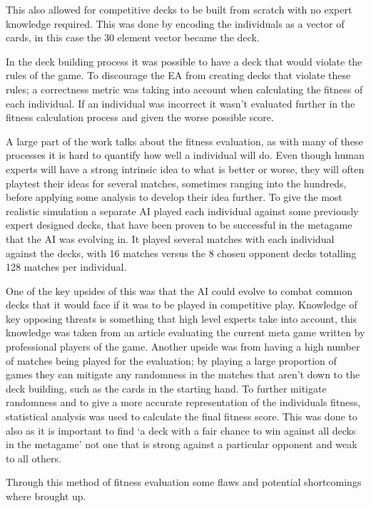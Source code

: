 \documentclass[a4paper]{article}
\begin{document}
This also allowed for competitive decks to be built from scratch with no expert knowledge required.
This was done by encoding the individuals as a vector of cards, in this case the 30 element vector became the deck.
\par
In the deck building process it was possible to have a deck that would violate the rules of the game.
To discourage the EA from creating decks that violate these rules; a correctness metric was taking into account when calculating the fitness of each individual.
If an individual was incorrect it wasn't evaluated further in the fitness calculation process and given the worse possible score.
\\ \par
A large part of the work talks about the fitness evaluation, as with many of these processes it is hard to quantify how well a individual will do.
Even though human experts will have a strong intrinsic idea to what is better or worse, they will often playtest their ideas for several matches, sometimes ranging into the hundreds, before applying some analysis to develop their idea further.
To give the most realistic simulation a separate AI played each individual against some previously expert designed decks, that have been proven to be successful in the metagame that the AI was evolving in.
It played several matches with each individual against the decks, with 16 matches versus the 8 chosen opponent decks totalling 128 matches per individual.
\par
One of the key upsides of this was that the AI could evolve to combat common decks that it would face if it was to be played in competitive play.
Knowledge of key opposing threats is something that high level experts take into account, this knowledge was taken from an article evaluating the current meta game written by professional players of the game.
Another upside was from having a high number of matches being played for the evaluation; by playing a large proportion of games they can mitigate any randomness in the matches that aren't down to the deck building, such as the cards in the starting hand.
To further mitigate randomness and to give a more accurate representation of the individuals fitness, statistical analysis was used to calculate the final fitness score.
This was done to also as it is important to find `a deck with a fair chance to win against all decks in the metagame' not one that is strong against a particular opponent and weak to all others.
\par
Through this method of fitness evaluation some flaws and potential shortcomings where brought up.
\end{document}
